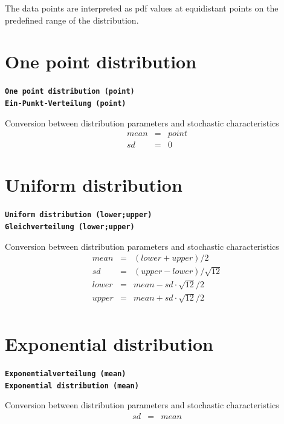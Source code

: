 \documentclass{svmono}
\def\cm#1{\textbf{\texttt{#1}}}
\begin{document}
The data points are interpreted as pdf values at equidistant points on the predefined range of the distribution.





\section*{One point distribution}

\cm{One point distribution (point)}~\\
\cm{Ein-Punkt-Verteilung (point)}

Conversion between distribution parameters and stochastic characteristics
\begin{eqnarray*}
mean&=&point\\
sd&=&0
\end{eqnarray*}





\section*{Uniform distribution}

\cm{Uniform distribution (lower;upper)}~\\
\cm{Gleichverteilung (lower;upper)}

Conversion between distribution parameters and stochastic characteristics
\begin{eqnarray*}
mean&=&(lower+upper)/2\\
sd&=&(upper-lower)/\sqrt{12}\\
lower&=&mean-sd\cdot\sqrt{12}/2\\
upper&=&mean+sd\cdot\sqrt{12}/2\\
\end{eqnarray*}





\section*{Exponential distribution}
\cm{Exponentialverteilung (mean)}~\\
\cm{Exponential distribution (mean)}

Conversion between distribution parameters and stochastic characteristics
\begin{eqnarray*}
sd&=&mean
\end{eqnarray*}
\end{document}

